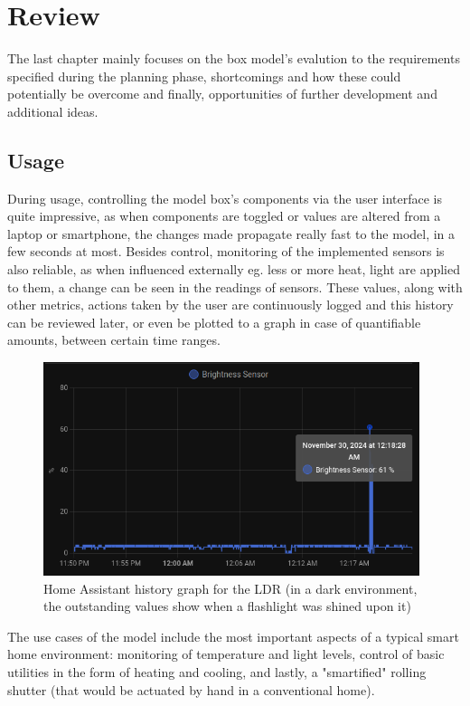 \chapter{Review}

The last chapter mainly focuses on the box model's evalution to the requirements specified during the planning phase, shortcomings and how these could potentially be overcome and finally, opportunities of further development and additional ideas.

\section{Usage}

During usage, controlling the model box's components via the user interface is quite impressive, as when components are toggled or values are altered from a laptop or smartphone, the changes made propagate really fast to the model, in a few seconds at most. Besides control, monitoring of the implemented sensors is also reliable, as when influenced externally eg. less or more heat, light are applied to them, a change can be seen in the readings of sensors. These values, along with other metrics, actions taken by the user are continuously logged and this history can be reviewed later, or even be plotted to a graph in case of quantifiable amounts, between certain time ranges.

\begin{figure}[!ht]
    \centering
    \includegraphics[width=110mm, keepaspectratio]{figures/homeassistant_graph_history.png}
    \caption{Home Assistant history graph for the LDR (in a dark environment, the outstanding values show when a flashlight was shined upon it)}
    \label{fig:HAgraphHistory}
  \end{figure}

The use cases of the model include the most important aspects of a typical smart home environment: monitoring of temperature and light levels, control of basic utilities in the form of heating and cooling, and lastly, a "smartified" rolling shutter (that would be actuated by hand in a conventional home).

